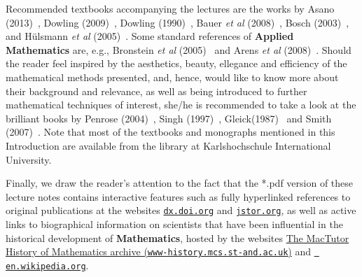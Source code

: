 \medskip
\noindent
Recommended textbooks accompanying the lectures are the works by 
Asano (2013)~, Dowling (2009)~, Dow\-ling 
(1990)~, Bauer \emph{et al} (2008)~,
Bosch (2003)~, and H\"ulsmann \emph{et al} 
(2005)~. Some standard references of {\bf Applied 
Mathematics} are, e.g., Bronstein \emph{et al} 
(2005)~ and Arens \emph{et al} 
(2008)~. Should the reader feel inspired by the 
aesthetics, beauty, ellegance and efficiency of the mathematical 
methods presented, and, hence, would like to know more about their 
background and relevance, as well as being introduced to further 
mathematical techniques of interest, she/he is recommended to take 
a look at the brilliant books by Penrose (2004)~, 
Singh (1997)~, Gleick(1987)~ and Smith 
(2007)~. Note that most of the textbooks and 
monographs mentioned in this Introduction are available from 
the library at Karls\-hochschule International University.

\medskip
\noindent
Finally, we draw the reader's attention to the fact that the
*.pdf version of these lecture notes contains interactive features 
such as fully hyperlinked references to original publications at 
the websites \href{http://dx.doi.org}{{\tt dx.doi.org}} and 
\href{http://www.jstor.org}{{\tt jstor.org}}, as well 
as active links to biographical information on scientists that 
have been influential in the historical development of {\bf 
Mathematics}, hosted by the websites 
\href{http://www-history.mcs.st-and.ac.uk/}{The MacTutor History 
of Mathematics archive ({\tt www-history.mcs.st-and.ac.uk})} and 
\href{http://en.wikipedia.org/wiki/Main_Page}{{\tt 
en.wikipedia.org}}.

